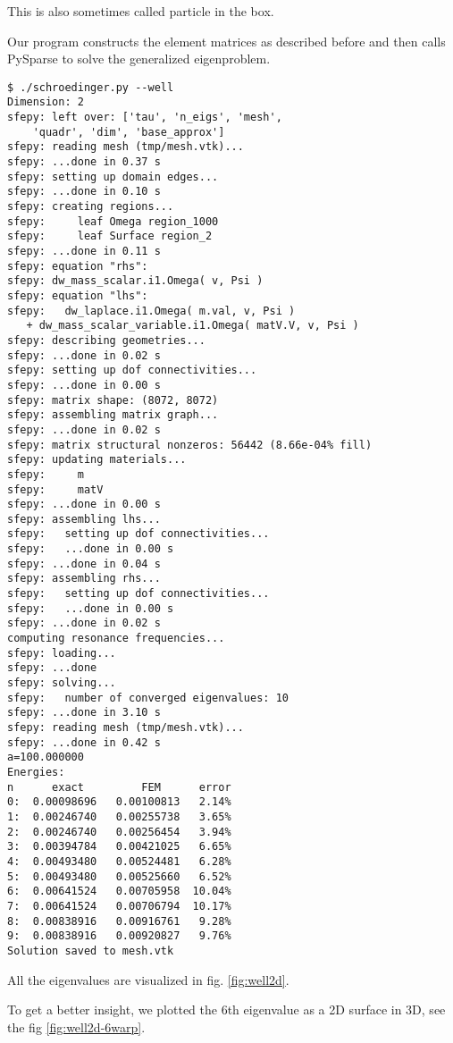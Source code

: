 This is also sometimes called particle in the box.

Our program constructs the element matrices as described before and then calls
PySparse\cite{geus} to solve the generalized eigenproblem.

\begin{lstlisting}
$ ./schroedinger.py --well
Dimension: 2
sfepy: left over: ['tau', 'n_eigs', 'mesh',
    'quadr', 'dim', 'base_approx']
sfepy: reading mesh (tmp/mesh.vtk)...
sfepy: ...done in 0.37 s
sfepy: setting up domain edges...
sfepy: ...done in 0.10 s
sfepy: creating regions...
sfepy:     leaf Omega region_1000
sfepy:     leaf Surface region_2
sfepy: ...done in 0.11 s
sfepy: equation "rhs":
sfepy: dw_mass_scalar.i1.Omega( v, Psi )
sfepy: equation "lhs":
sfepy:   dw_laplace.i1.Omega( m.val, v, Psi )
   + dw_mass_scalar_variable.i1.Omega( matV.V, v, Psi )
sfepy: describing geometries...
sfepy: ...done in 0.02 s
sfepy: setting up dof connectivities...
sfepy: ...done in 0.00 s
sfepy: matrix shape: (8072, 8072)
sfepy: assembling matrix graph...
sfepy: ...done in 0.02 s
sfepy: matrix structural nonzeros: 56442 (8.66e-04% fill)
sfepy: updating materials...
sfepy:     m
sfepy:     matV
sfepy: ...done in 0.00 s
sfepy: assembling lhs...
sfepy:   setting up dof connectivities...
sfepy:   ...done in 0.00 s
sfepy: ...done in 0.04 s
sfepy: assembling rhs...
sfepy:   setting up dof connectivities...
sfepy:   ...done in 0.00 s
sfepy: ...done in 0.02 s
computing resonance frequencies...
sfepy: loading...
sfepy: ...done
sfepy: solving...
sfepy:   number of converged eigenvalues: 10
sfepy: ...done in 3.10 s
sfepy: reading mesh (tmp/mesh.vtk)...
sfepy: ...done in 0.42 s
a=100.000000
Energies:
n      exact         FEM      error
0:  0.00098696   0.00100813   2.14%
1:  0.00246740   0.00255738   3.65%
2:  0.00246740   0.00256454   3.94%
3:  0.00394784   0.00421025   6.65%
4:  0.00493480   0.00524481   6.28%
5:  0.00493480   0.00525660   6.52%
6:  0.00641524   0.00705958  10.04%
7:  0.00641524   0.00706794  10.17%
8:  0.00838916   0.00916761   9.28%
9:  0.00838916   0.00920827   9.76%
Solution saved to mesh.vtk
\end{lstlisting}

All the eigenvalues are visualized in fig. \ref{fig:well2d}.


To get a better insight, we plotted the 6th eigenvalue as a 2D surface in 3D,
see the fig \ref{fig:well2d-6warp}.

